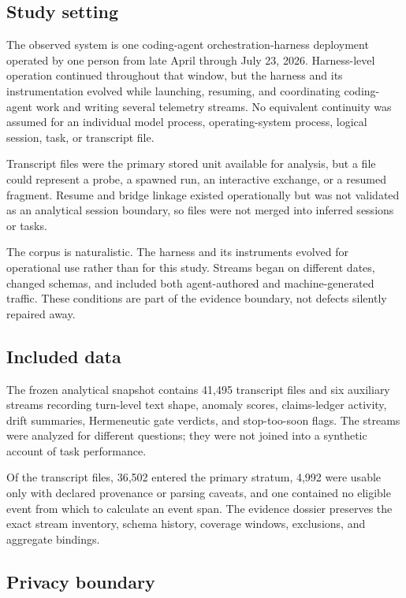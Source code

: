 \documentclass[12pt]{article}
\begin{document}
\subsection{Study setting}\label{study-setting}

The observed system is one coding-agent orchestration-harness deployment operated by one person from late April through July 23, 2026. Harness-level operation continued throughout that window, but the harness and its instrumentation evolved while launching, resuming, and coordinating coding-agent work and writing several telemetry streams. No equivalent continuity was assumed for an individual model process, operating-system process, logical session, task, or transcript file.

Transcript files were the primary stored unit available for analysis, but a file could represent a probe, a spawned run, an interactive exchange, or a resumed fragment. Resume and bridge linkage existed operationally but was not validated as an analytical session boundary, so files were not merged into inferred sessions or tasks.

The corpus is naturalistic. The harness and its instruments evolved for operational use rather than for this study. Streams began on different dates, changed schemas, and included both agent-authored and machine-generated traffic. These conditions are part of the evidence boundary, not defects silently repaired away.

\subsection{Included data}\label{included-data}

The frozen analytical snapshot contains 41,495 transcript files and six auxiliary streams recording turn-level text shape, anomaly scores, claims-ledger activity, drift summaries, Hermeneutic gate verdicts, and stop-too-soon flags. The streams were analyzed for different questions; they were not joined into a synthetic account of task performance.

Of the transcript files, 36,502 entered the primary stratum, 4,992 were usable only with declared provenance or parsing caveats, and one contained no eligible event from which to calculate an event span. The evidence dossier preserves the exact stream inventory, schema history, coverage windows, exclusions, and aggregate bindings.

\subsection{Privacy boundary}\label{privacy-boundary}
\end{document}
